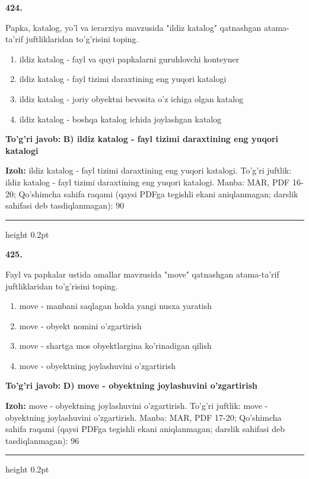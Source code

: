 \documentclass[10pt,a4paper]{article}
\begin{document}
{\bfseries\sffamily\color{ink} 424.}
\par
Papka, katalog, yo'l va ierarxiya mavzusida "ildiz katalog" qatnashgan atama-ta'rif juftliklaridan to'g'risini toping.
\begin{enumerate}[label=\Alph*),leftmargin=9mm]
\item ildiz katalog - fayl va quyi papkalarni guruhlovchi konteyner
\item ildiz katalog - fayl tizimi daraxtining eng yuqori katalogi
\item ildiz katalog - joriy obyektni bevosita o'z ichiga olgan katalog
\item ildiz katalog - boshqa katalog ichida joylashgan katalog
\end{enumerate}
\begin{tcolorbox}[enhanced,breakable,colback=teal!4,colframe=teal!60!black,boxrule=0.45pt,arc=1.2mm,left=2.7mm,right=2.7mm,top=1.8mm,bottom=1.8mm,before skip=2mm,after skip=2mm]
{\bfseries\sffamily\color{teal}To'g'ri javob:} \textbf{B) ildiz katalog - fayl tizimi daraxtining eng yuqori katalogi}
\par\smallskip
{\bfseries Izoh:} ildiz katalog - fayl tizimi daraxtining eng yuqori katalogi. To'g'ri juftlik: ildiz katalog - fayl tizimi daraxtining eng yuqori katalogi. Manba: MAR, PDF 16-20; Qo'shimcha sahifa raqami (qaysi PDFga tegishli ekani aniqlanmagan; darslik sahifasi deb tasdiqlanmagan): 90
\end{tcolorbox}
\vspace{2mm}\hrule height 0.2pt\vspace{3mm}

{\bfseries\sffamily\color{ink} 425.}
\par
Fayl va papkalar ustida amallar mavzusida "move" qatnashgan atama-ta'rif juftliklaridan to'g'risini toping.
\begin{enumerate}[label=\Alph*),leftmargin=9mm]
\item move - manbani saqlagan holda yangi nusxa yaratish
\item move - obyekt nomini o'zgartirish
\item move - shartga mos obyektlargina ko'rinadigan qilish
\item move - obyektning joylashuvini o'zgartirish
\end{enumerate}
\begin{tcolorbox}[enhanced,breakable,colback=teal!4,colframe=teal!60!black,boxrule=0.45pt,arc=1.2mm,left=2.7mm,right=2.7mm,top=1.8mm,bottom=1.8mm,before skip=2mm,after skip=2mm]
{\bfseries\sffamily\color{teal}To'g'ri javob:} \textbf{D) move - obyektning joylashuvini o'zgartirish}
\par\smallskip
{\bfseries Izoh:} move - obyektning joylashuvini o'zgartirish. To'g'ri juftlik: move - obyektning joylashuvini o'zgartirish. Manba: MAR, PDF 17-20; Qo'shimcha sahifa raqami (qaysi PDFga tegishli ekani aniqlanmagan; darslik sahifasi deb tasdiqlanmagan): 96
\end{tcolorbox}
\vspace{2mm}\hrule height 0.2pt\vspace{3mm}
\end{document}
